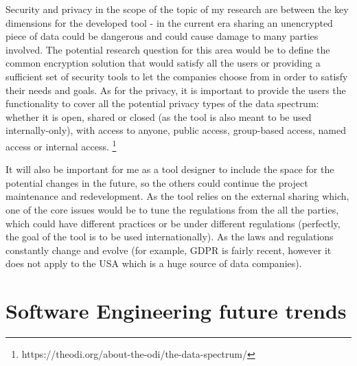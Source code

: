 \documentclass{article}
\begin{document}
Security and privacy in the scope of the topic of my research are between the key dimensions for the developed tool - in the current era sharing an unencrypted piece of data could be dangerous and could cause damage to many parties involved. The potential research question for this area would be to define the common encryption solution  that would satisfy all the users or providing a sufficient set of security tools to let the companies choose from in order to satisfy their needs and goals.
\newline As for the privacy, it is important to provide the users the functionality to cover all the potential privacy types of the data spectrum: whether it is open, shared or closed (as the tool is also meant to be used internally-only), with access to anyone, public access, group-based access, named access or internal access. \footnote{https://theodi.org/about-the-odi/the-data-spectrum/}

It will also be important for me as a tool designer to include the space for the potential changes in the future, so the others could continue the project maintenance and redevelopment. As the tool relies on the external sharing which, one of the core issues would be to tune the regulations from the all the parties, which could have different practices or be under different regulations (perfectly, the goal of the tool is to be used internationally). As the laws and regulations constantly change and evolve (for example, GDPR is fairly recent, however it does not apply to the USA which is a huge source of data companies). 

\section{Software Engineering future trends}
\end{document}
